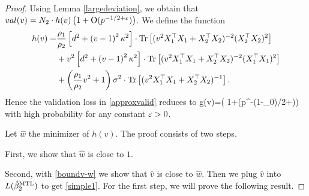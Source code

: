 \begin{proof}
	Using Lemma \ref{largedeviation}, we obtain that $val(v)= N_2\cdot h(v)  \left( 1+\operatorname{O}(p^{-1/2+{\varepsilon}})\right)$.
	We define the function
	\begin{align}
		h(v) =& \frac{\rho_1}{\rho_2}\left[d^2 +\left( v-1\right)^2\kappa^2\right]\cdot \operatorname{Tr}\left[( v^2X_1^{\top}X_1 +X_2^{\top}X_2)^{-2} (X_2^{\top}X_2)^2\right] \nonumber \\
		& +  v^2\left[d^2 +\left( v-1\right)^2\kappa^2\right]\cdot \operatorname{Tr}\left[( v^2X_1^{\top}X_1 +X_2^{\top}X_2)^{-2} (X_1^{\top}X_1)^2\right] \nonumber\\
		& + \left(\frac{\rho_1}{\rho_2} v^2 + 1\right)\sigma^2 \cdot \operatorname{Tr}\left[(v^2X_1^{\top}X_1  + X_2^{\top}X_2)^{-1} \right]. \nonumber
	\end{align}
	Hence the validation loss in \eqref{approxvalid} reduces to
	\be\label{boundv-w}
		g(v)=\cdot \left( 1+\OO(p^{-(1-\e_0)/2+\e})\right)
	\ee
	with high probability for any constant ${\varepsilon}>0$. %

Let $\hat w$ the minimizer of $h(v)$. The proof consists of two steps.
\squishlist
	\item First, we show that $\hat{w}$ is close to $1$.
	\item Second, with \eqref{boundv-w} we show that $\hat v$ is close to $\hat w$. Then we plug $\hat{v}$ into $L(\hat{\beta}_2^{\text{MTL}})$ to get \eqref{simple1}.
\squishend
For the first step, we will prove the following result.


\end{proof}
